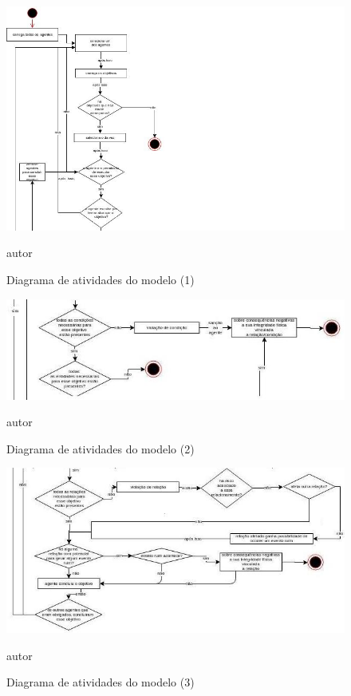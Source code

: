 \begin{figure}[H]
  \centering
  \caption{Diagrama de atividades do modelo (1)}
  \includegraphics[width=1.5\linewidth]{figure/diag1.jpg} 
  \begin{center}
    autor
  \end{center}
  \label{atividiagram1}
\end{figure}


\begin{figure}[H]
  \centering
  \caption{Diagrama de atividades do modelo (2)}
  \includegraphics[width=1.1\linewidth]{figure/diag2.jpg} 
  \begin{center}
    autor
  \end{center}
  \label{atividiagram2}
\end{figure}

\begin{figure}[H]
  \centering
  \caption{Diagrama de atividades do modelo (3)}
  \includegraphics[width=1.1\linewidth]{figure/diag3.jpg} 
  \begin{center}
    autor
  \end{center}
  \label{atividiagram3}
\end{figure}


